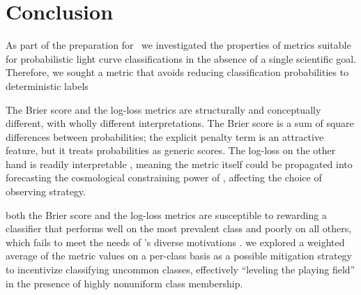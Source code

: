 \section{Conclusion}
\label{sec:conclusion}

As part of the preparation for \plasticc\, we investigated the properties of metrics suitable for probabilistic light curve classifications in the absence of a single scientific goal.
Therefore, we sought a metric that avoids reducing classification probabilities to deterministic labels 

The Brier score and the log-loss metrics are structurally and conceptually different, with wholly different interpretations.
The Brier score is a sum of square differences between probabilities;
the explicit penalty term is an attractive feature, but it treats probabilities as generic scores.
The log-loss on the other hand is readily interpretable , meaning the metric itself could be propagated into forecasting the cosmological constraining power of \lsst, affecting the choice of observing strategy.

 both the Brier score and the log-loss metrics are susceptible to rewarding a classifier that performs well on the most prevalent class and poorly on all others, which fails to meet the needs of \plasticc's diverse motivations .
 we explored a weighted average of the metric values on a per-class basis as a possible mitigation strategy to incentivize classifying uncommon classes, effectively ``leveling the playing field'' in the presence of highly nonuniform class membership.

